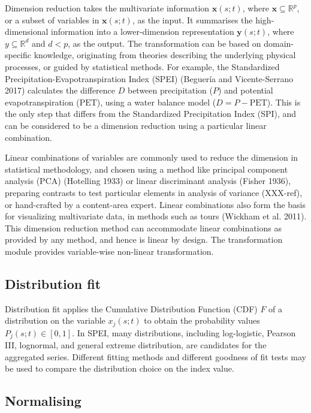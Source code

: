 \documentclass[
]{interact}
\begin{document}
Dimension reduction takes the multivariate information
\(\mathbf{x}(s;t)\), where \(\mathbf{x} \subseteq \mathbb{R}^p\), or a
subset of variables in \(\mathbf{x}(s;t)\), as the input. It summarises
the high-dimensional information into a lower-dimension representation
\(\mathbf{y}(s;t)\), where \(y \subseteq \mathbb{R}^d\) and \(d < p\),
as the output. The transformation can be based on domain-specific
knowledge, originating from theories describing the underlying physical
processes, or guided by statistical methods. For example, the
Standardized Precipitation-Evapotranspiration Index (SPEI) (Beguería and
Vicente-Serrano 2017) calculates the difference \(D\) between
precipitation (\(P\)) and potential evapotranspiration (\(\text{PET}\)),
using a water balance model (\(D = P - \text{PET}\)). This is the only
step that differs from the Standardized Precipitation Index (SPI), and
can be considered to be a dimension reduction using a particular linear
combination.

Linear combinations of variables are commonly used to reduce the
dimension in statistical methodology, and chosen using a method like
principal component analysis (PCA) (Hotelling 1933) or linear
discriminant analysis (Fisher 1936), preparing contrasts to test
particular elements in analysis of variance (XXX-ref), or hand-crafted
by a content-area expert. Linear combinations also form the basis for
visualizing multivariate data, in methods such as tours (Wickham et al.
2011). This dimension reduction method can accommodate linear
combinations as provided by any method, and hence is linear by design.
The transformation module provides variable-wise non-linear
transformation.

\hypertarget{distribution-fit}{%
\subsection{Distribution fit}\label{distribution-fit}}

Distribution fit applies the Cumulative Distribution Function (CDF)
\(F\) of a distribution on the variable \(x_j(s; t)\) to obtain the
probability values \(P_j(s;t) \in [0, 1]\). In SPEI, many distributions,
including log-logistic, Pearson III, lognormal, and general extreme
distribution, are candidates for the aggregated series. Different
fitting methods and different goodness of fit tests may be used to
compare the distribution choice on the index value.

\hypertarget{normalising}{%
\subsection{Normalising}\label{normalising}}
\end{document}
